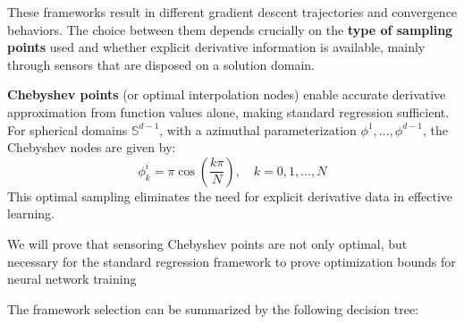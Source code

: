 \documentclass[a4paper]{article}
\theoremstyle{plain}
\theoremstyle{definition}
\theoremstyle{remark}
\begin{document}
These frameworks result in different gradient descent trajectories and convergence behaviors. 
The choice between them depends crucially on the \textbf{type of sampling points} used and whether explicit derivative 
information is available, mainly through sensors that are disposed on a solution domain.

\begin{tcolorbox}[colback=yellow!10,colframe=red!60!black,title={\textbf{Informal Key Insight : Chebyshev Points vs General Sampling in numerical analysis}},enhanced,drop shadow]
\textbf{Chebyshev points} (or optimal interpolation nodes) \cite{driscoll2014chebfun} enable accurate derivative approximation from function values alone, making standard regression sufficient. For spherical domains $\mathbb{S}^{d-1}$, with a azimuthal parameterization $\phi^{1},...,\phi^{d-1}$, the Chebyshev nodes are given by:
$$\phi_k^{i} = \pi \cos\left(\frac{k\pi}{N}\right), \quad k = 0, 1, \ldots, N$$
This optimal sampling eliminates the need for explicit derivative data in effective learning.
\end{tcolorbox}

\begin{tcolorbox}[colback=yellow!10,colframe=red!60!black,title={\textbf{Personal contribution : Chebyshev Points}},enhanced,drop shadow]
We will prove that sensoring Chebyshev points are not only optimal, but necessary for the standard regression framework to prove
optimization bounds for neural network training
\end{tcolorbox}


The framework selection can be summarized by the following decision tree:
\end{document}

